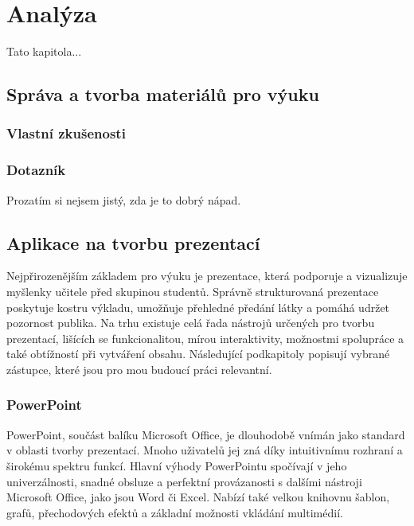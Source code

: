 \chapter{Analýza}

\begin{chapterabstract}
Tato kapitola...
\end{chapterabstract}


\section{Správa a tvorba materiálů pro výuku}
\subsection{Vlastní zkušenosti}
\subsection{Dotazník}

Prozatím si nejsem jistý, zda je to dobrý nápad.

\section{Aplikace na tvorbu prezentací}

Nejpřirozenějším základem pro výuku je prezentace, která podporuje a vizualizuje myšlenky učitele před skupinou studentů.
Správně strukturovaná prezentace poskytuje kostru výkladu, umožňuje přehledné předání látky a pomáhá udržet pozornost publika.
Na trhu existuje celá řada nástrojů určených pro tvorbu prezentací, lišících se funkcionalitou, mírou interaktivity, možnostmi spolupráce a také obtížností při vytváření obsahu.
Následující podkapitoly popisují vybrané zástupce, které jsou pro mou budoucí práci relevantní.

\subsection{PowerPoint}

PowerPoint, součást balíku Microsoft Office, je dlouhodobě vnímán jako standard v oblasti tvorby prezentací.
Mnoho uživatelů jej zná díky intuitivnímu rozhraní a širokému spektru funkcí.
Hlavní výhody PowerPointu spočívají v jeho univerzálnosti, snadné obsluze a perfektní provázanosti s dalšími nástroji Microsoft Office, jako jsou Word či Excel.
Nabízí také velkou knihovnu šablon, grafů, přechodových efektů a základní možnosti vkládání multimédií.


